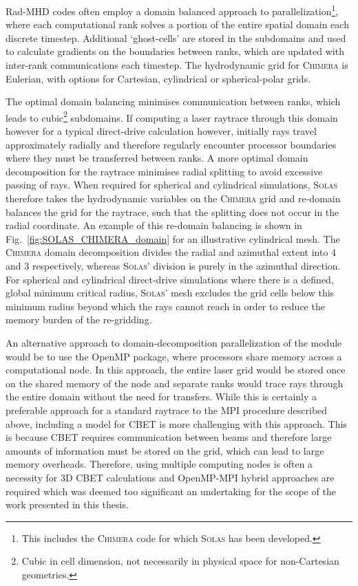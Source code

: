 \ac{Rad-MHD} codes often employ a domain balanced approach to parallelization\footnote{This includes the \textsc{Chimera} code for which \textsc{Solas} has been developed.}, where each computational rank solves a portion of the entire spatial domain each discrete timestep.
Additional `ghost-cells' are stored in the subdomains and used to calculate gradients on the boundaries between ranks, which are updated with inter-rank communications each timestep.
The hydrodynamic grid for \textsc{Chimera} is Eulerian, with options for Cartesian, cylindrical or spherical-polar grids.

The optimal domain balancing minimises communication between ranks, which leads to cubic\footnote{Cubic in cell dimension, not necessarily in physical space for non-Cartesian geometries.} subdomains.
If computing a laser raytrace through this domain however for a typical direct-drive calculation however, initially rays travel approximately radially and therefore regularly encounter processor boundaries where they must be transferred between ranks.
A more optimal domain decomposition for the raytrace minimises radial splitting to avoid excessive passing of rays.
When required for spherical and cylindrical simulations, \textsc{Solas} therefore takes the hydrodynamic variables on the \textsc{Chimera} grid and re-domain balances the grid for the raytrace, such that the splitting does not occur in the radial coordinate.
An example of this re-domain balancing is shown in Fig.~\ref{fig:SOLAS_CHIMERA_domain} for an illustrative cylindrical mesh.
The \textsc{Chimera} domain decomposition divides the radial and azimuthal extent into 4 and 3 respectively, whereas \textsc{Solas}' division is purely in the azimuthal direction.
For spherical and cylindrical direct-drive simulations where there is a defined, global minimum critical radius, \textsc{Solas}' mesh excludes the grid cells below this minimum radius beyond which the rays cannot reach in order to reduce the memory burden of the re-gridding.

An alternative approach to domain-decomposition parallelization of the module would be to use the \ac{OpenMP} package, where processors share memory across a computational node.
In this approach, the entire laser grid would be stored once on the shared memory of the node and separate ranks would trace rays through the entire domain without the need for transfers.
While this is certainly a preferable approach for a standard raytrace to the \ac{MPI} procedure described above, including a model for \ac{CBET} is more challenging with this approach.
This is because \ac{CBET} requires communication between beams and therefore large amounts of information must be stored on the grid, which can lead to large memory overheads.
Therefore, using multiple computing nodes is often a necessity for 3D \ac{CBET} calculations and \ac{OpenMP}-\ac{MPI} hybrid approaches are required which was deemed too significant an undertaking for the scope of the work presented in this thesis.


